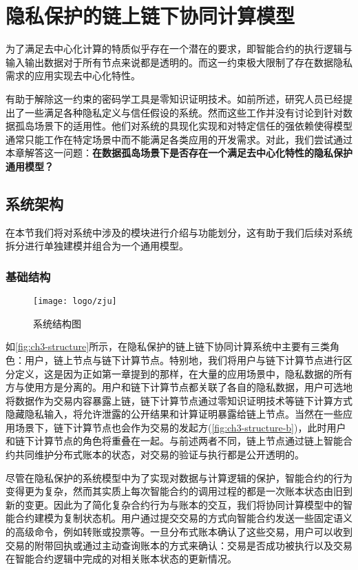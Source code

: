 \chapter{隐私保护的链上链下协同计算模型}

为了满足去中心化计算的特质似乎存在一个潜在的要求，即智能合约的执行逻辑与输入输出数据对于所有节点来说都是透明的。而这一约束极大限制了存在数据隐私需求的应用实现去中心化特性。

有助于解除这一约束的密码学工具是零知识证明技术。如前所述，研究人员已经提出了一些满足各种隐私定义与信任假设的系统\cite{//}。然而这些工作并没有讨论到针对数据孤岛场景下的适用性。他们对系统的具现化实现和对特定信任的强依赖使得模型通常只能工作在特定场景中而不能满足各类应用的开发需求。对此，我们尝试通过本章解答这一问题：\textbf{在数据孤岛场景下是否存在一个满足去中心化特性的隐私保护通用模型？}
\section{系统架构}
在本节我们将对系统中涉及的模块进行介绍与功能划分，这有助于我们后续对系统拆分进行单独建模并组合为一个通用模型。
\subsection{基础结构}
\begin{figure}[htbp]
    \centering
    \texttt{[image: logo/zju]}
    \caption{\label{fig:ch3-structure}系统结构图}
\end{figure}

如\autoref{fig:ch3-structure}所示，在隐私保护的链上链下协同计算系统中主要有三类角色：用户，链上节点与链下计算节点。特别地，我们将用户与链下计算节点进行区分定义，这是因为正如第一章提到的那样，在大量的应用场景中，隐私数据的所有方与使用方是分离的。用户和链下计算节点都关联了各自的隐私数据，用户可选地将数据作为交易内容暴露上链，链下计算节点通过零知识证明技术等链下计算方式隐藏隐私输入，将允许泄露的公开结果和计算证明暴露给链上节点。当然在一些应用场景下，链下计算节点也会作为交易的发起方(\autoref{fig:ch3-structure-b})，此时用户和链下计算节点的角色将重叠在一起。与前述两者不同，链上节点通过链上智能合约共同维护分布式账本的状态，对交易的验证与执行都是公开透明的。

尽管在隐私保护的系统模型中为了实现对数据与计算逻辑的保护，智能合约的行为变得更为复杂，然而其实质上每次智能合约的调用过程的都是一次账本状态由旧到新的变更。因此为了简化复杂合约行为与账本的交互，我们将协同计算模型中的智能合约建模为复制状态机。用户通过提交交易的方式向智能合约发送一些固定语义的高级命令，例如转账或投票等。一旦分布式账本确认了这些交易，用户可以收到交易的附带回执或通过主动查询账本的方式来确认：交易是否成功被执行以及交易在智能合约逻辑中完成的对相关账本状态的更新情况。

